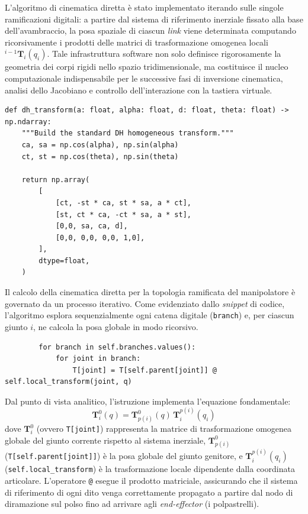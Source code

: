 L'algoritmo di cinematica diretta è stato implementato iterando sulle singole ramificazioni digitali: a partire dal sistema di riferimento inerziale fissato alla base dell'avambraccio, la posa spaziale di ciascun \textit{link} viene determinata computando ricorsivamente i prodotti delle matrici di trasformazione omogenea locali ${}^{i-1}\boldsymbol{T}_i(q_i)$. 
Tale infrastruttura software non solo definisce rigorosamente la geometria dei corpi rigidi nello spazio tridimensionale, ma costituisce il nucleo computazionale indispensabile per le successive fasi di inversione cinematica, analisi dello Jacobiano e controllo dell'interazione con la tastiera virtuale.

\begin{lstlisting}
def dh_transform(a: float, alpha: float, d: float, theta: float) -> np.ndarray:
    """Build the standard DH homogeneous transform."""
    ca, sa = np.cos(alpha), np.sin(alpha)
    ct, st = np.cos(theta), np.sin(theta)

    return np.array(
        [
            [ct, -st * ca, st * sa, a * ct],
            [st, ct * ca, -ct * sa, a * st],
            [0,0, sa, ca, d],
            [0,0, 0,0, 0,0, 1,0],
        ],
        dtype=float,
    )
\end{lstlisting}




Il calcolo della cinematica diretta per la topologia ramificata del manipolatore è governato da un processo iterativo. Come evidenziato dallo \textit{snippet} di codice, l'algoritmo esplora sequenzialmente ogni catena digitale (\texttt{branch}) e, per ciascun giunto $i$, ne calcola la posa globale in modo ricorsivo. 
\begin{lstlisting}
        for branch in self.branches.values():
            for joint in branch:
                T[joint] = T[self.parent[joint]] @  self.local_transform(joint, q)
\end{lstlisting}
Dal punto di vista analitico, l'istruzione implementa l'equazione fondamentale:
\[
    \boldsymbol{T}_i^0(q) = \boldsymbol{T}_{p(i)}^0(q) \, \boldsymbol{T}_i^{p(i)}(q_i)
\]
dove $\boldsymbol{T}_i^0$ (ovvero \texttt{T[joint]}) rappresenta la matrice di trasformazione omogenea globale del giunto corrente rispetto al sistema inerziale, $\boldsymbol{T}_{p(i)}^0$ (\texttt{T[self.parent[joint]]}) è la posa globale del giunto genitore, e $\boldsymbol{T}_i^{p(i)}(q_i)$ (\texttt{self.local\_transform}) è la trasformazione locale dipendente dalla coordinata articolare. L'operatore \texttt{@} esegue il prodotto matriciale, assicurando che il sistema di riferimento di ogni dito venga correttamente propagato a partire dal nodo di diramazione sul polso fino ad arrivare agli \textit{end-effector} (i polpastrelli).

